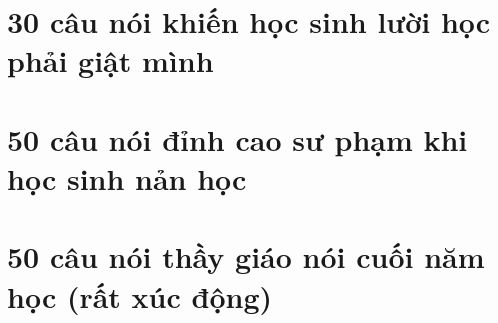 \documentclass[14pt,a4paper,twoside]{extbook}
\begin{document}

\frontmatter
\tableofcontents
\clearpage


\mainmatter

\part{30 câu nói khiến học sinh lười học phải giật mình}




\part{50 câu nói đỉnh cao sư phạm khi học sinh nản học}






\part{50 câu nói thầy giáo nói cuối năm học (rất xúc động)}






\backmatter

\end{document}
